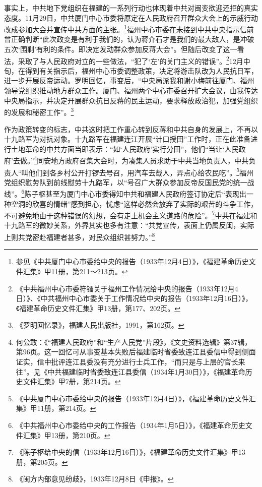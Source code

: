 事实上，中共地下党组织在福建的一系列行动也体现着中共对闽变欲迎还拒的真实态度。11月29日，中共厦门中心市委将原定在人民政府召开群众大会上的示威行动改成参加大会并宣传中共方面的主张。\footnote{参见《中共厦门中心市委给中央的报告（1933年12月4日）》，《福建革命历史文件汇集》甲11册，第211～213页。}福州中心市委在未接到中共中央指示信前曾正确判断“此次政变是有利于我们的，认为蒋介石才是我们的最大敌人，是冲破五次‘围剿’有利的条件。即决定发动群众参加反蒋大会”。但随后改变了这一看法，采取了与人民政府对立的一些做法，“犯了‘左’的关门主义的错误”。\footnote{《中共福州中心市委符镭关于福州工作情况给中央的报告（1933年12月4日）》、《中共福州中心市委关于工作情况给中央的报告（1933年12月16日）》，《福建革命历史文件汇集》甲13册，第177、202页。}12月中旬，在得到有关指示后，福州中心市委调整政策，决定将游击队改为人民抗日军，进一步开展反帝运动。罗明回忆，事变后，“中央局派我和谢小梅前往厦门、福州领导党组织推动地方群众工作。厦门、福州两个中心市委召开扩大会议，由我传达中央局指示，并决定开展群众抗日反蒋的民主运动，要求释放政治犯，加强党组织的发展和秘密工作”。\footnote{《罗明回忆录》，福建人民出版社，1991，第162页。}


作为政策转变的标志，中共这时把工作重心转到反蒋和中共自身的发展上，不再以十九路军为对抗对象。十九路军在福建连江开展“计口授田”工作时，正在此准备进行土地革命的中共方面当即表示：“如‘人民政府’实行分田”，他们“当让‘人民政府’去做。”\footnote{何公敢：《“福建人民政府”和“生产人民党”片段》，《文史资料选辑》第37辑，第96页。这一回忆可从事变基本失败后福建临时省委致连江县委信中得到侧面证实，信中批评连江县委没有充分进行士兵工作，“而只是与上层的官长来往”。见《中共福建临时省委致连江县委信（1934年1月30日）》，《福建革命历史文件汇集》甲7册，第214页。}同安地方政府召集大会时，为凑集人员求助于中共当地负责人，中共负责人“叫他们到各乡村公开打锣去号召，用汽车去载人，弄点心给农民吃”。\footnote{《中共厦门中心市委给中央的报告（1933年12月4日）》，《福建革命历史文件汇集》甲11册，第214页。}福州党组织慰劳队到前线慰劳十九路军，以“号召广大群众参加反帝反国民党的统一战线”。\footnote{《中共福州中心市委给中央的工作报告（1934年1月5日）》，《福建革命历史文件汇集》甲13册，第210页。}陈子枢甚至为厦门中心市委得知中共和福建人民政府签订协定后“表现出一种空洞的欣喜的情绪”感到担心，忧虑“这样必然会放弃了实际的艰苦的斗争工作，不可避免地由于这种错误的幻想，会有走上机会主义道路的危险”。\footnote{《陈子枢给中央的信（1933年12月16日）》，《福建革命历史文件汇集》甲13册，第205页。}中共在福建和十九路军的微妙关系，外界其实也多有注意：“共党宣传，表面上仍属反闽，实际上则共党密赴福建者甚多，对民众组织甚努力。”\footnote{《闽方内部意见纷歧》，1933年12月8日《申报》。}


